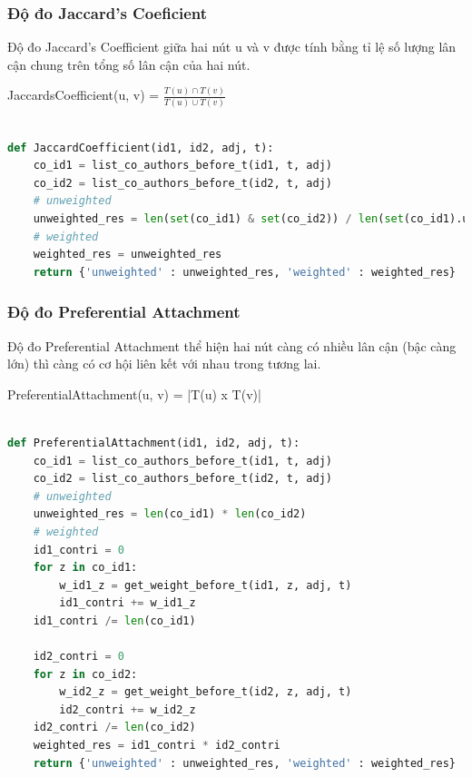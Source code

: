 \documentclass{article}
\begin{document}
\subsubsection{Độ đo Jaccard's Coeficient}

Độ đo Jaccard's Coefficient giữa hai nút u và v được tính bằng tỉ lệ số lượng lân cận chung trên tổng số lân cận của hai nút.

\begin{center}
JaccardsCoefficient(u, v) = $\frac{T(u) \cap T(v)}{T(u) \cup T(v)}$
\end{center}

\begin{lstlisting}[language=Python, caption=Độ đo Jaccard's Coefficient]

def JaccardCoefficient(id1, id2, adj, t):
    co_id1 = list_co_authors_before_t(id1, t, adj)
    co_id2 = list_co_authors_before_t(id2, t, adj)
    # unweighted
    unweighted_res = len(set(co_id1) & set(co_id2)) / len(set(co_id1).union(set(co_id2)))
    # weighted
    weighted_res = unweighted_res
    return {'unweighted' : unweighted_res, 'weighted' : weighted_res}

\end{lstlisting}


\subsubsection{Độ đo Preferential Attachment}

Độ đo Preferential Attachment thể hiện hai nút càng có nhiều lân cận (bậc càng lớn) thì càng có cơ hội liên kết với nhau trong tương lai.

\begin{center}
PreferentialAttachment(u, v) = |T(u) x T(v)|
\end{center}

\begin{lstlisting}[language=Python, caption=Độ đo Preferential Attachment]

def PreferentialAttachment(id1, id2, adj, t):
    co_id1 = list_co_authors_before_t(id1, t, adj)
    co_id2 = list_co_authors_before_t(id2, t, adj)
    # unweighted
    unweighted_res = len(co_id1) * len(co_id2)
    # weighted
    id1_contri = 0
    for z in co_id1:
        w_id1_z = get_weight_before_t(id1, z, adj, t)
        id1_contri += w_id1_z
    id1_contri /= len(co_id1)

    id2_contri = 0
    for z in co_id2:
        w_id2_z = get_weight_before_t(id2, z, adj, t)
        id2_contri += w_id2_z
    id2_contri /= len(co_id2)
    weighted_res = id1_contri * id2_contri
    return {'unweighted' : unweighted_res, 'weighted' : weighted_res}

\end{lstlisting}
\end{document}
